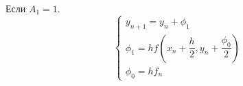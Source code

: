 \begin{examples}
  Если $A_1 = 1$.
  \begin{equation}
    \begin{cases}
      y_{n + 1} = y_n + \phi_1\\
      \phi_1 = hf\left(x_n + \dfrac{h}{2}, y_n + \dfrac{\phi_0}{2}\right)\\
      \phi_0 = hf_n
    \end{cases}
  \end{equation}
\end{examples}
